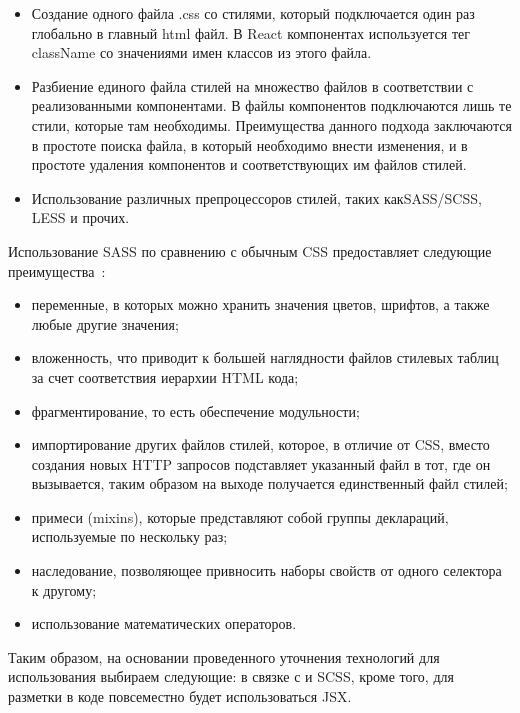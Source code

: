 \begin{itemize}
	\item Создание одного файла .css со стилями, который подключается один раз глобально в главный html файл. В React компонентах используется тег className со значениями имен классов из этого файла.
	\item Разбиение единого файла стилей на множество файлов в соответствии с реализованными компонентами. В файлы компонентов подключаются лишь те стили, которые там необходимы. Преимущества данного подхода заключаются в простоте поиска файла, в который необходимо внести изменения, и в простоте удаления компонентов и соответствующих им файлов стилей.
	\item Использование различных препроцессоров стилей, таких как\linebreak SASS/SCSS, LESS и прочих. 
\end{itemize}

Использование SASS по сравнению с обычным CSS предоставляет следующие преимущества~\cite{sass_guide}:

\begin{itemize}
	\item переменные, в которых можно хранить значения цветов, шрифтов, а также любые другие значения;
	\item вложенность, что приводит к большей наглядности файлов стилевых таблиц за счет соответствия иерархии HTML кода;
	\item фрагментирование, то есть обеспечение модульности;
	\item импортирование других файлов стилей, которое, в отличие от CSS, вместо создания новых HTTP запросов подставляет указанный файл в тот, где он вызывается, таким образом на выходе получается единственный файл стилей;
	\item примеси (mixins), которые представляют собой группы деклараций, используемые по нескольку раз;
	\item наследование, позволяющее привносить наборы свойств от одного селектора к другому;
	\item использование математических операторов.
\end{itemize}

Таким образом, на основании проведенного уточнения технологий для использования выбираем следующие: \react в связке с \mobx и SCSS, кроме того, для разметки в коде повсеместно будет использоваться JSX.

\subsubsection{}
\label{sec:design:client:ux}

